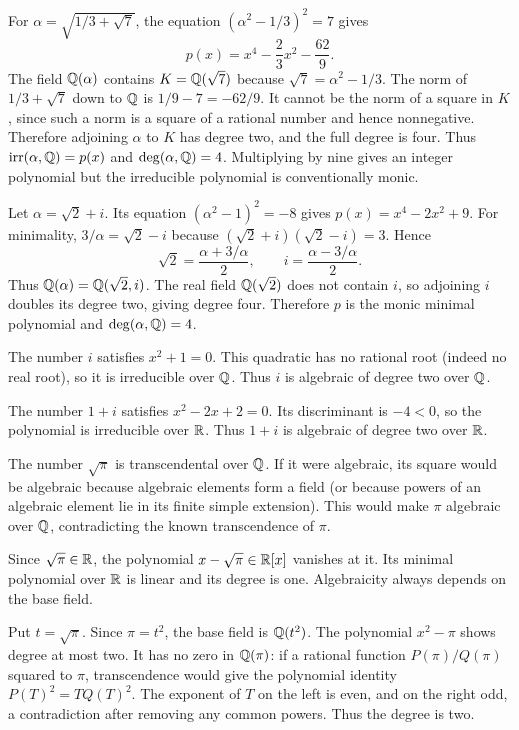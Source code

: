 For $\alpha=\sqrt{1/3+\sqrt7}$, the equation $(\alpha^2-1/3)^2=7$ gives
\[p(x)=x^4-\frac23x^2-\frac{62}{9}.\]
The field $\mathbb{Q}(\alpha)$ contains $K=\mathbb{Q}(\sqrt7)$ because $\sqrt7=\alpha^2-1/3$. The norm of $1/3+\sqrt7$ down to $\mathbb{Q}$ is $1/9-7=-62/9$. It cannot be the norm of a square in $K$, since such a norm is a square of a rational number and hence nonnegative. Therefore adjoining $\alpha$ to $K$ has degree two, and the full degree is four. Thus $\operatorname{irr}(\alpha,\mathbb{Q})=p(x)$ and $\deg(\alpha,\mathbb{Q})=4$. Multiplying by nine gives an integer polynomial but the irreducible polynomial is conventionally monic.

Let $\alpha=\sqrt2+i$. Its equation $(\alpha^2-1)^2=-8$ gives $p(x)=x^4-2x^2+9$.
For minimality, $3/\alpha=\sqrt2-i$ because $(\sqrt2+i)(\sqrt2-i)=3$. Hence
\[\sqrt2=\frac{\alpha+3/\alpha}{2},\qquad i=\frac{\alpha-3/\alpha}{2}.\]
Thus $\mathbb{Q}(\alpha)=\mathbb{Q}(\sqrt2,i)$. The real field $\mathbb{Q}(\sqrt2)$ does not contain $i$, so adjoining $i$ doubles its degree two, giving degree four. Therefore $p$ is the monic minimal polynomial and $\deg(\alpha,\mathbb{Q})=4$.

The number $i$ satisfies $x^2+1=0$. This quadratic has no rational root (indeed no real root), so it is irreducible over $\mathbb{Q}$. Thus $i$ is algebraic of degree two over $\mathbb{Q}$.

The number $1+i$ satisfies $x^2-2x+2=0$. Its discriminant is $-4<0$, so the polynomial is irreducible over $\mathbb{R}$. Thus $1+i$ is algebraic of degree two over $\mathbb{R}$.

The number $\sqrt\pi$ is transcendental over $\mathbb{Q}$. If it were algebraic, its square would be algebraic because algebraic elements form a field (or because powers of an algebraic element lie in its finite simple extension). This would make $\pi$ algebraic over $\mathbb{Q}$, contradicting the known transcendence of $\pi$.

Since $\sqrt\pi\in\mathbb{R}$, the polynomial $x-\sqrt\pi\in\mathbb{R}[x]$ vanishes at it. Its minimal polynomial over $\mathbb{R}$ is linear and its degree is one. Algebraicity always depends on the base field.

Put $t=\sqrt\pi$. Since $\pi=t^2$, the base field is $\mathbb{Q}(t^2)$. The polynomial $x^2-\pi$ shows degree at most two. It has no zero in $\mathbb{Q}(\pi)$: if a rational function $P(\pi)/Q(\pi)$ squared to $\pi$, transcendence would give the polynomial identity $P(T)^2=TQ(T)^2$. The exponent of $T$ on the left is even, and on the right odd, a contradiction after removing any common powers. Thus the degree is two.

